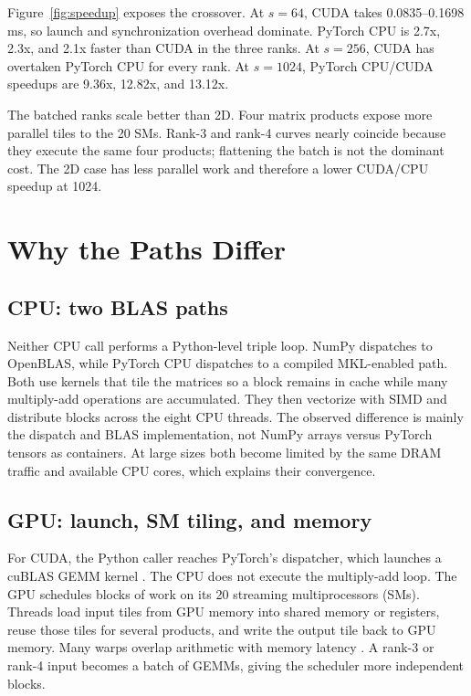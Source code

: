 \documentclass{article}
\begin{document}
Figure~\ref{fig:speedup} exposes the crossover. At $s=64$, CUDA takes
0.0835--0.1698 ms, so launch and synchronization overhead dominate. PyTorch CPU
is 2.7x, 2.3x, and 2.1x faster than CUDA in the three ranks. At $s=256$, CUDA
has overtaken PyTorch CPU for every rank. At $s=1024$, PyTorch CPU/CUDA
speedups are 9.36x, 12.82x, and 13.12x.

The batched ranks scale better than 2D. Four matrix products expose more
parallel tiles to the 20 SMs. Rank-3 and rank-4 curves nearly coincide because
they execute the same four products; flattening the batch is not the dominant
cost. The 2D case has less parallel work and therefore a lower CUDA/CPU
speedup at 1024.

\section{Why the Paths Differ}\label{sec:principles}

\subsection{CPU: two BLAS paths}

Neither CPU call performs a Python-level triple loop. NumPy dispatches to
OpenBLAS, while PyTorch CPU dispatches to a compiled MKL-enabled path. Both use
kernels that tile the matrices so a block remains in cache while many
multiply-add operations are accumulated. They then vectorize with SIMD and
distribute blocks across the eight CPU threads. The observed difference is
mainly the dispatch and BLAS implementation, not NumPy arrays versus PyTorch
tensors as containers. At large sizes both become limited by the same DRAM
traffic and available CPU cores, which explains their convergence.

\subsection{GPU: launch, SM tiling, and memory}

For CUDA, the Python caller reaches PyTorch's dispatcher, which launches a
cuBLAS GEMM kernel \citep{nvidia2026cublas}. The CPU does not execute the
multiply-add loop. The GPU schedules blocks of work on its 20 streaming
multiprocessors (SMs). Threads load input tiles from GPU memory into shared
memory or registers, reuse those tiles for several products, and write the
output tile back to GPU memory. Many warps overlap arithmetic with memory
latency \citep{nvidia2026cuda}. A rank-3 or rank-4 input becomes a batch of
GEMMs, giving the scheduler more independent blocks.
\end{document}
